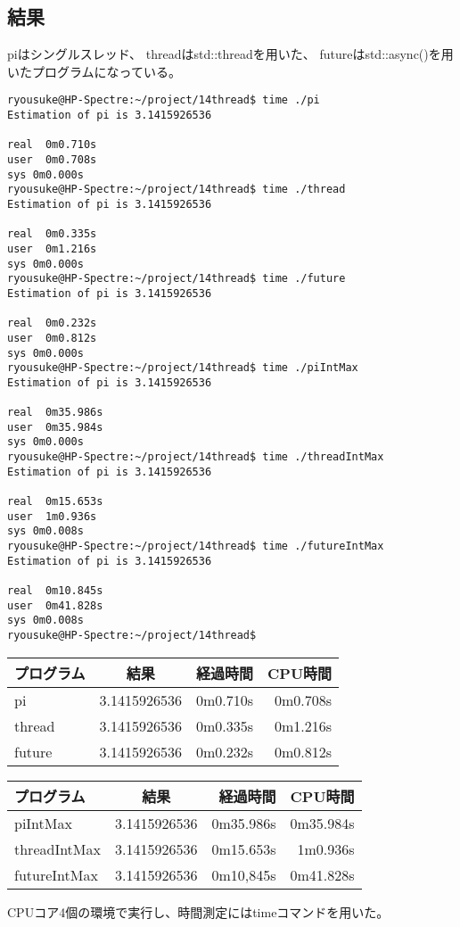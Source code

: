 \documentclass[a4j]{jarticle}
\begin{document}
\subsection{結果}
piはシングルスレッド、
threadはstd::threadを用いた、
futureはstd::async()を用いたプログラムになっている。
\begin{screen}
\begin{verbatim}
ryousuke@HP-Spectre:~/project/14thread$ time ./pi
Estimation of pi is 3.1415926536

real  0m0.710s
user  0m0.708s
sys 0m0.000s
ryousuke@HP-Spectre:~/project/14thread$ time ./thread
Estimation of pi is 3.1415926536

real  0m0.335s
user  0m1.216s
sys 0m0.000s
ryousuke@HP-Spectre:~/project/14thread$ time ./future
Estimation of pi is 3.1415926536

real  0m0.232s
user  0m0.812s
sys 0m0.000s
ryousuke@HP-Spectre:~/project/14thread$ time ./piIntMax
Estimation of pi is 3.1415926536

real  0m35.986s
user  0m35.984s
sys 0m0.000s
ryousuke@HP-Spectre:~/project/14thread$ time ./threadIntMax
Estimation of pi is 3.1415926536

real  0m15.653s
user  1m0.936s
sys 0m0.008s
ryousuke@HP-Spectre:~/project/14thread$ time ./futureIntMax
Estimation of pi is 3.1415926536

real  0m10.845s
user  0m41.828s
sys 0m0.008s
ryousuke@HP-Spectre:~/project/14thread$ 
\end{verbatim}
\end{screen}

\begin{table}[htb]
\begin{center}
\begin{tabular}{|l|c|r|r|} \hline
プログラム & 結果 & 経過時間 & CPU時間 \\ \hline
pi & 3.1415926536 & 0m0.710s & 0m0.708s \\
thread & 3.1415926536 & 0m0.335s & 0m1.216s \\
future & 3.1415926536 & 0m0.232s & 0m0.812s \\ \hline
\end{tabular}
\end{center}
\end{table}

\begin{table}[htb]
\begin{center}
\begin{tabular}{|l|c|r|r|} \hline
プログラム & 結果 & 経過時間 & CPU時間 \\ \hline
piIntMax & 3.1415926536 & 0m35.986s & 0m35.984s \\
threadIntMax & 3.1415926536 & 0m15.653s & 1m0.936s \\
futureIntMax & 3.1415926536 & 0m10,845s & 0m41.828s \\ \hline
\end{tabular}
\end{center}
\end{table}
CPUコア4個の環境で実行し、時間測定にはtimeコマンドを用いた。
\end{document}
